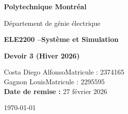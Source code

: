 \documentclass[11pt]{article}
\begin{document}
    \begin{titlepage}
        \centering
        \vspace*{2cm}
        {\LARGE \textbf{Polytechnique Montréal}\par}
        \vspace{0.5cm}
        {\Large Département de génie électrique\par}
        \vspace{2cm}
        {\Huge \textbf{ELE2200 --Système et Simulation}\par}
        \vspace{0.5cm}
        {\Huge \textbf{Devoir 3 (Hiver 2026)}\par}
        \vspace{2cm}

        \begin{flushleft}
            Costa Diego Alfonso\hfill Matricule : 2374165\\
            Gagnon Louis\hfill Matricule : 2295595\\
            \vspace{0.8cm}
            \textbf{Date de remise :} 27 février 2026\\
        \end{flushleft}

        \vfill
        {\large \today\par}
    \end{titlepage}

    \tableofcontents
    \clearpage

    
    
    
    
    

    \printbibliography
\end{document}
